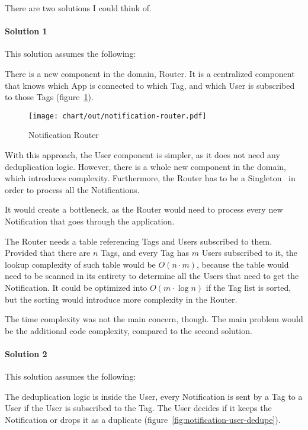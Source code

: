 There are two solutions I could think of.

\paragraph*{Solution 1}\label{par:duplication-solution-1}

This solution assumes the following:

There is a new component in the domain, Router.
It is a centralized component
that knows which App is connected to which Tag,
and which User is subscribed to those Tags
(figure~\ref{fig:notification-router}).

\begin{figure}[h]
  \centering
  \texttt{[image: chart/out/notification-router.pdf]}
  \caption{Notification Router}
  \label{fig:notification-router}
\end{figure}

With this approach,
the User component is simpler,
as it does not need any deduplication logic.
However, there is a whole new component
in the domain, which introduces complexity.
Furthermore, the Router has to be
a Singleton~\cite[pp.~127-134]{gamma_design_1994}
in order to process all the Notifications.

It would create a bottleneck,
as the Router would need to process every new Notification
that goes through the application.

The Router needs a table referencing
Tags and Users subscribed to them.
Provided that there are $n$ Tags,
and every Tag has $m$ Users subscribed to it,
the lookup complexity of such table
would be $O(n \cdot m)$,
because the table would need to be
scanned in its entirety to determine
all the Users that need to get the Notification.
It could be optimized into $O(m \cdot \log n)$
if the Tag list is sorted,
but the sorting would introduce
more complexity in the Router.

The time complexity was not the main concern, though.
The main problem would be
the additional code complexity,
compared to the second solution.

\paragraph*{Solution 2}\label{par:duplication-solution-2}

This solution assumes the following:

The deduplication logic is inside the User,
every Notification is sent by a Tag to a User
if the User is subscribed to the Tag.
The User decides if it keeps the Notification
or drops it as a duplicate
(figure~\ref{fig:notification-user-dedupe}).

